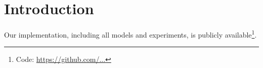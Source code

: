 \section{Introduction}


Our implementation, including all models and experiments, is publicly available\footnote{Code: \url{https://github.com/...}}.